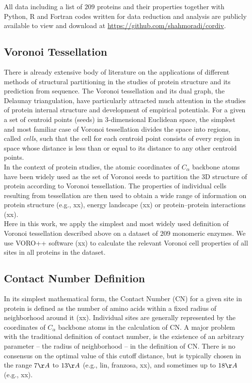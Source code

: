 \documentclass[11pt]{article}
\begin{document}
        All data including a list of $209$ proteins and their properties together with Python, R and Fortran codes written for data reduction and analysis are publicly available to view and download at \url{https://github.com/shahmoradi/cordiv}.

    \subsection*{Voronoi Tessellation}

        There is already extensive body of literature on the applications of different methods of structural partitioning in the studies of protein structure and its prediction from sequence. The Voronoi tessellation and its dual graph, the Delaunay triangulation, have particularly attracted much attention in the studies of protein internal structure and development of empirical potentials. For a given a set of centroid points (seeds) in 3-dimensional Euclidean space, the simplest and most familiar case of Voronoi tessellation divides the space into regions, called {\it cells}, such that the cell for each centroid point consists of every region in space whose distance is less than or equal to its distance to any other centroid points. \\

        In the context of protein studies, the atomic coordinates of $C_\alpha$ backbone atoms have been widely used as the set of Voronoi seeds to partition the 3D structure of protein according to Voronoi tessellation. The properties of individual cells resulting from tessellation are then used to obtain a wide range of information on protein structure (e.g., xx), energy landscape (xx) or protein--protein interactions (xx). \\

        Here in this work, we apply the simplest and most widely used definition of Voronoi tessellation described above on a dataset of $209$  monomeric enzymes. We use VORO++ software (xx) to calculate the relevant Voronoi cell properties of all sites in all proteins in the dataset.

    \subsection*{Contact Number Definition}

        In its simplest mathematical form, the Contact Number (CN) for a given site in protein is defined as the number of amino acids within a fixed radius of neighborhood around it (xx). Individual sites are generally represented by the coordinates of $C_\alpha$ backbone atoms in the calculation of CN. A major problem with the traditional definition of contact number, is the existence of an arbitrary parameter -- the radius of neighborhood --  in the definition of CN. There is no consensus on the optimal value of this cutoff distance, but is typically chosen in the range $7\AA$ to $13\AA$ (e.g., lin, franzosa, xx), and sometimes up to $18\AA$ (e.g., xx). \\
\end{document}
